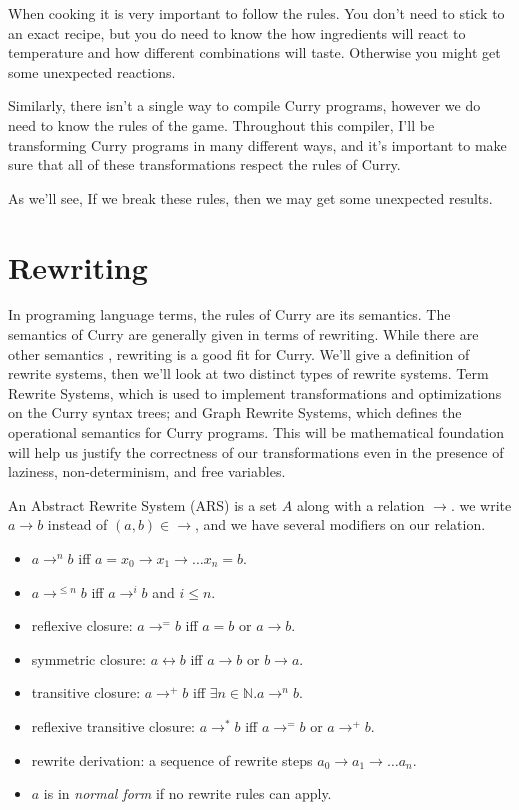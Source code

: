 \documentclass{article}
\def\N{\mathbb{N}}
\theoremstyle{definition}
\begin{document}
When cooking it is very important to follow the rules.
You don't need to stick to an exact recipe, 
but you do need to know the how ingredients will react to temperature
and how different combinations will taste.
Otherwise you might get some unexpected reactions.

Similarly, there isn't a single way to compile Curry programs,
however we do need to know the rules of the game.
Throughout this compiler, I'll be transforming Curry programs
in many different ways, and it's important to make sure that all
of these transformations respect the rules of Curry.

As we'll see, If we break these rules, 
then we may get some unexpected results.

\section{Rewriting}
In programing language terms, the rules of Curry are its semantics.
The semantics of Curry are generally given in terms of rewriting.
\cite{?}
While there are other semantics \cite{?}, 
rewriting is a good fit for Curry.
We'll give a definition of rewrite systems,
then we'll look at two distinct types of rewrite systems.
Term Rewrite Systems, which is used to implement transformations and optimizations
on the Curry syntax trees;
and Graph Rewrite Systems, which defines the operational semantics for Curry programs.
This will be mathematical foundation will help us justify the correctness of our transformations
even in the presence of laziness, non-determinism, and free variables.

An Abstract Rewrite System (ARS) is a set $A$ along with a relation $\to$.
we write $a \to b$ instead of $(a,b) \in \to$, and we have several modifiers on our relation.
\begin{itemize}
    \item $a \to^n b$ iff $a = x_0 \to x_1 \to \ldots x_n = b$.
    \item $a \to^{\le n} b$ iff $a \to^i b$ and $i \leq n$.
    \item reflexive closure: $a \to^= b$ iff $a = b$ or $a \to b$.
    \item symmetric closure: $a \leftrightarrow b$ iff $a \to b$ or $b \to a$.
    \item transitive closure: $a \to^+ b$ iff $\exists n\in \N. a \to^n b$.
    \item reflexive transitive closure: $a \to^* b$ iff $a \to^= b$ or $a \to^+ b$.
    \item rewrite derivation: a sequence of rewrite steps $a_0 \to a_1 \to \ldots a_n$.
    \item $a$ is in \textit{normal form} if no rewrite rules can apply.
\end{itemize}
\end{document}
